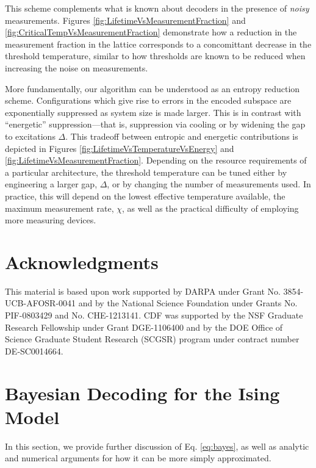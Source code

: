 \documentclass[twocolumn,superscriptaddress,aps,prb,floatfix]{revtex4-1}
\begin{document}
This scheme complements what is known about decoders in the presence of \emph{noisy} measurements.  Figures \ref{fig:LifetimeVsMeasurementFraction} and \ref{fig:CriticalTempVsMeasurementFraction} demonstrate how a reduction in the measurement fraction in the lattice corresponds to a concomittant decrease in the threshold temperature, similar to how thresholds are known to be reduced when increasing the noise on measurements.

More fundamentally, our algorithm can be understood as an entropy reduction scheme.  Configurations which give rise to errors in the encoded subspace are exponentially suppressed as system size is made larger.  This is in contrast with ``energetic'' suppression---that is, suppression via cooling or by widening the gap to excitations $\Delta$.  This tradeoff between entropic and energetic contributions is depicted in Figures \ref{fig:LifetimeVsTemperatureVsEnergy} and \ref{fig:LifetimeVsMeasurementFraction}.  Depending on the resource requirements of a particular architecture, the threshold temperature can be tuned either by engineering a larger gap, $\Delta$, or by changing the number of measurements used.  In practice, this will depend on the lowest effective temperature available, the maximum measurement rate, $\chi$, as well as the practical difficulty of employing more measuring devices.



\section{Acknowledgments}
This material is based upon work supported by DARPA under Grant No. 3854-UCB-AFOSR-0041 and by the National Science Foundation under Grants No. PIF-0803429 and No. CHE-1213141.  CDF was supported by the NSF Graduate Research Fellowship under Grant DGE-1106400 and by the DOE Office of Science Graduate Student Research (SCGSR) program under contract number DE‐SC0014664.


\appendix
\section{Bayesian Decoding for the Ising Model}
\label{sec:bayesdecoder}

In this section, we provide further discussion of Eq. \ref{eq:bayes}, as well as analytic and numerical arguments for how it can be more simply approximated.
\end{document}

